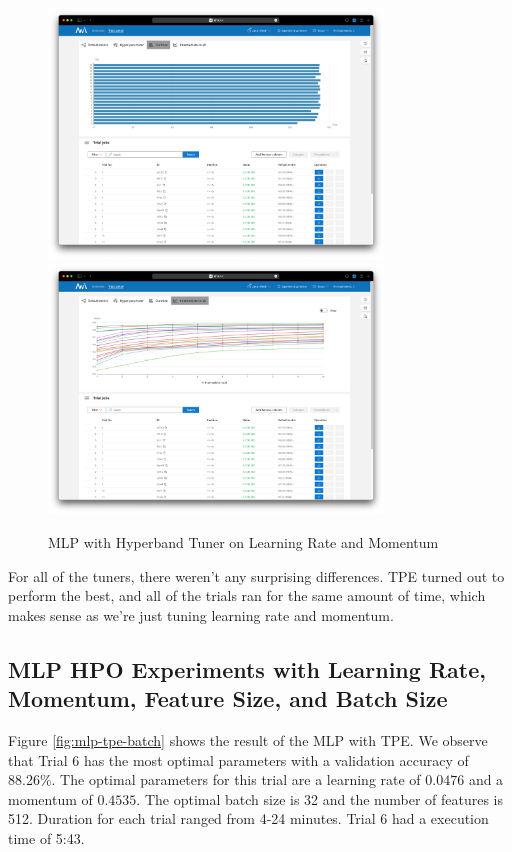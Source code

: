 \documentclass{article}
\begin{document}
\begin{figure}
    \centerline{\includegraphics[width=3.5in]{../proj3/figures/mlp_hyperband_latency.png}\includegraphics[width=3.5in]{../proj3/figures/mlp_hyperband_intermediate.png}}
    \caption{MLP with Hyperband Tuner on Learning Rate and Momentum}
    \label{fig:mlp-hyperband}
\end{figure}

For all of the tuners, there weren't any surprising differences. TPE turned out to perform the best, and all of the trials ran for the same amount of time, which makes sense as we're just tuning learning rate and momentum.

\subsection{MLP HPO Experiments with Learning Rate, Momentum, Feature Size, and Batch Size}

Figure \ref{fig:mlp-tpe-batch} shows the result of the MLP with TPE. We observe that Trial 6 has the most optimal parameters with a validation accuracy of 88.26\%. The optimal parameters for this trial are a learning rate of $0.0476$ and a momentum of $0.4535$. The optimal batch size is 32 and the number of features is 512. Duration for each trial ranged from 4-24 minutes. Trial 6 had a execution time of 5:43.
\end{document}
